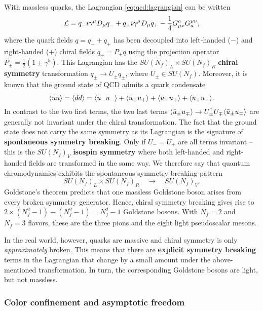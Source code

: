 With massless quarks, the Lagrangian \eqref{eq:qcd:lagrangian} can be written
\begin{equation}
	\mathcal{L} = \bar{q}_- i \gamma^\mu D_\mu q_- + \bar{q}_+ i \gamma^\mu D_\mu q_+ - \frac14 G_{\mu\nu}^a G^{\mu\nu}_a,
\end{equation}
where the quark fields $q = q_- + q_+$ has been decoupled into left-handed ($-$) and right-handed ($+$) chiral fields $q_\pm = P_\pm q$ using the projection operator $P_\pm = \frac12 (1 \pm \gamma^5)$.
This Lagrangian has the $SU(N_f)_L \times SU(N_f)_R$ \textbf{chiral symmetry} transformation $q_\pm \rightarrow U_\pm q_\pm$, where $U_\pm \in SU(N_f)$.
Moreover, it is known that the ground state of QCD admits a quark condensate \cite[chapter 28]{ref:schwartz}
\begin{equation}
	\langle \bar{u} u \rangle = \langle \bar{d} d \rangle = \langle \bar{u}_- u_- \rangle + \langle \bar{u}_+ u_+ \rangle + \langle \bar{u}_- u_+ \rangle + \langle \bar{u}_+ u_- \rangle.
\end{equation}
In contrast to the two first terms, the two last terms $\langle \bar{u}_\pm u_\mp \rangle \rightarrow U_\pm^\dagger U_\mp \langle \bar{u}_\pm u_\mp \rangle$ are generally not invariant under the chiral transformation.
The fact that the ground state does not carry the same symmetry as its Lagrangian is the signature of \textbf{spontaneous symmetry breaking}.
Only if $U_- = U_+$ are all terms invariant -- this is the $SU(N_f)_V$ \textbf{isospin symmetry} where both left-handed and right-handed fields are transformed in the same way.
We therefore say that quantum chromodynamics exhibits the spontaneous symmetry breaking pattern
\begin{equation}
	SU(N_f)_L \times SU(N_f)_R \quad \rightarrow \quad SU(N_f)_V .
\end{equation}
Goldstone's theorem predicts that one massless Goldstone boson arises from every broken symmetry generator.
Hence, chiral symmetry breaking gives rise to $2 \times (N_f^2 - 1) - (N_f^2 - 1) = N_f^2 - 1$ Goldstone bosons.
With $N_f = 2$ and $N_f = 3$ flavors, these are the three pions and the eight light pseudoscalar mesons.

In the real world, however, quarks are massive and chiral symmetry is only \emph{approximately} broken.
This means that there are \textbf{explicit symmetry breaking} terms in the Lagrangian that change by a small amount under the above-mentioned transformation.
In turn, the corresponding Goldstone bosons are light, but not massless.

\subsubsection{Color confinement and asymptotic freedom}

